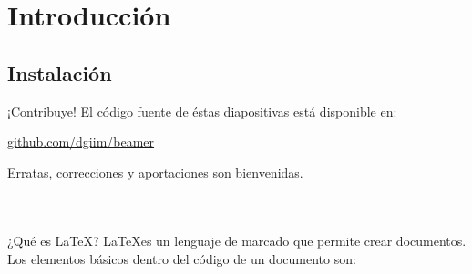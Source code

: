 \section{Introducción}

\subsection{Instalación}

\begin{frame}{¡Contribuye!}
  El código fuente de éstas diapositivas está disponible en:
\begin{center}
  \huge \href{http://github.com/dgiim/beamer}{github.com/dgiim/beamer}
\end{center}
  Erratas, correcciones y aportaciones son bienvenidas.
  \espacio
  \begin{columns}[c]
      \hyperlink{beamer}{}
      \hyperlink{latex}{}
  \end{columns}
\end{frame}

\begin{frame}{¿Qué es \LaTeX?}
  \hypertarget<1>{latex}{}
  \LaTeX es un lenguaje de marcado que permite crear documentos. Los elementos
  básicos dentro del código de un documento son:
  \espacio
  \begin{overlayarea}{\textwidth}{5cm}

  \end{overlayarea}
\end{frame}

